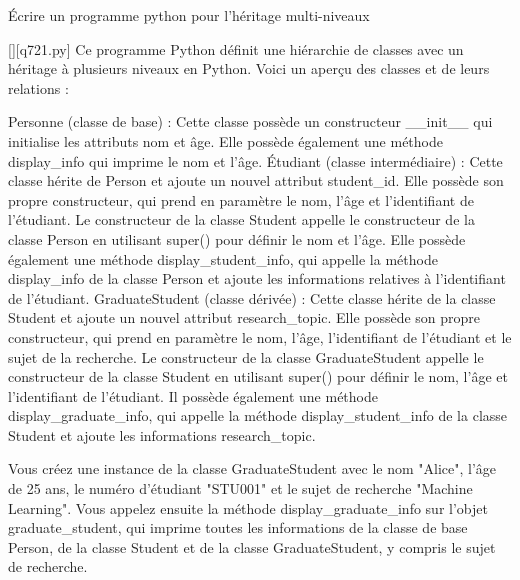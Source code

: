         \question
        Écrire un programme python pour l'héritage multi-niveaux
        \par
        \begin{solution}
            \renewcommand{\nomfichier}{q721.py}
            \pythonfile{\chemincode \nomfichier}[][\nomfichier]
            Ce programme Python définit une hiérarchie de classes avec un héritage à plusieurs niveaux en Python. Voici un aperçu des classes et de leurs relations :

    Personne (classe de base) : Cette classe possède un constructeur \_\_init\_\_ qui initialise les attributs nom et âge. Elle possède également une méthode display\_info qui imprime le nom et l'âge.
    Étudiant (classe intermédiaire) : Cette classe hérite de Person et ajoute un nouvel attribut student\_id. Elle possède son propre constructeur, qui prend en paramètre le nom, l'âge et l'identifiant de l'étudiant. Le constructeur de la classe Student appelle le constructeur de la classe Person en utilisant super() pour définir le nom et l'âge. Elle possède également une méthode display\_student\_info, qui appelle la méthode display\_info de la classe Person et ajoute les informations relatives à l'identifiant de l'étudiant.
    GraduateStudent (classe dérivée) : Cette classe hérite de la classe Student et ajoute un nouvel attribut research\_topic. Elle possède son propre constructeur, qui prend en paramètre le nom, l'âge, l'identifiant de l'étudiant et le sujet de la recherche. Le constructeur de la classe GraduateStudent appelle le constructeur de la classe Student en utilisant super() pour définir le nom, l'âge et l'identifiant de l'étudiant. Il possède également une méthode display\_graduate\_info, qui appelle la méthode display\_student\_info de la classe Student et ajoute les informations research\_topic.

Vous créez une instance de la classe GraduateStudent avec le nom "Alice", l'âge de 25 ans, le numéro d'étudiant "STU001" et le sujet de recherche "Machine Learning". Vous appelez ensuite la méthode display\_graduate\_info sur l'objet graduate\_student, qui imprime toutes les informations de la classe de base Person, de la classe Student et de la classe GraduateStudent, y compris le sujet de recherche.
        \end{solution}
        

